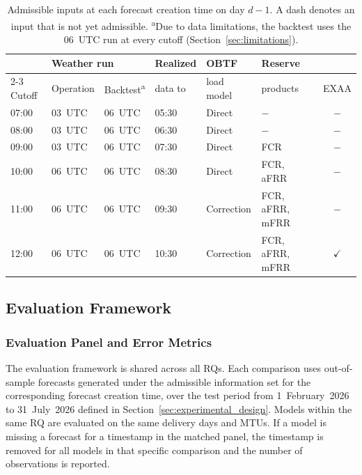 

\FloatBarrier

\begin{table}[H]
  \centering
  \footnotesize
  \setlength{\tabcolsep}{5pt}
  \caption[Admissible inputs at each forecast creation time.]
  {Admissible inputs at each forecast creation time on day \(d-1\). A dash denotes an input that is not yet admissible.
  \textsuperscript{a}Due to data limitations, the backtest uses the 06~UTC run at
  every cutoff (Section~\ref{sec:limitations}).}
  \label{tab:cutoff_accrual}
  \begin{tabular}{@{}llllllc@{}}
    \toprule
    & \multicolumn{2}{l}{Weather run} & Realized & OBTF & Reserve & \\
    \cmidrule(lr){2-3}
    Cutoff & Operation & Backtest\textsuperscript{a} & data to & load model & products & EXAA \\
    \midrule
    07:00 & 03~UTC & 06~UTC & 05:30 & Direct & \(-\) & \(-\) \\
    08:00 & 03~UTC & 06~UTC & 06:30 & Direct & \(-\) & \(-\) \\
    09:00 & 03~UTC & 06~UTC & 07:30 & Direct & FCR & \(-\) \\
    10:00 & 06~UTC & 06~UTC & 08:30 & Direct & FCR, aFRR & \(-\) \\
    11:00 & 06~UTC & 06~UTC & 09:30 & Correction & FCR, aFRR, mFRR & \(-\) \\
    12:00 & 06~UTC & 06~UTC & 10:30 & Correction & FCR, aFRR, mFRR
      & \(\checkmark\) \\
    \bottomrule
  \end{tabular}
\end{table}

\FloatBarrier

\subsection{Evaluation Framework}
\label{sec:evaluation}

\subsubsection{Evaluation Panel and Error Metrics}
\label{sec:error_metrics}

The evaluation framework is shared across all RQs. Each
comparison uses
out-of-sample forecasts generated under the admissible information set for the
corresponding forecast creation time, over the test period from
1~February~2026 to 31~July~2026 defined in
Section~\ref{sec:experimental_design}. Models within the same RQ
are evaluated on the same delivery days and MTUs. If a model is
missing a forecast for a timestamp in the matched panel, the timestamp is
removed for all models in that specific comparison and the number of
observations is reported.

